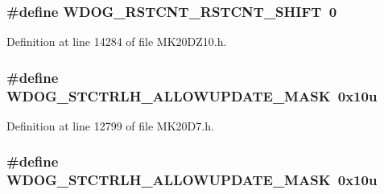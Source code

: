 \subsubsection[{\texorpdfstring{W\+D\+O\+G\+\_\+\+R\+S\+T\+C\+N\+T\+\_\+\+R\+S\+T\+C\+N\+T\+\_\+\+S\+H\+I\+FT}{WDOG_RSTCNT_RSTCNT_SHIFT}}]{\setlength{\rightskip}{0pt plus 5cm}\#define W\+D\+O\+G\+\_\+\+R\+S\+T\+C\+N\+T\+\_\+\+R\+S\+T\+C\+N\+T\+\_\+\+S\+H\+I\+FT~0}\hypertarget{group___w_d_o_g___register___masks_gaf2ecbd74ca7b1ba60bc7b89de17b97a6}{}\label{group___w_d_o_g___register___masks_gaf2ecbd74ca7b1ba60bc7b89de17b97a6}


Definition at line 14284 of file M\+K20\+D\+Z10.\+h.

\subsubsection[{\texorpdfstring{W\+D\+O\+G\+\_\+\+S\+T\+C\+T\+R\+L\+H\+\_\+\+A\+L\+L\+O\+W\+U\+P\+D\+A\+T\+E\+\_\+\+M\+A\+SK}{WDOG_STCTRLH_ALLOWUPDATE_MASK}}]{\setlength{\rightskip}{0pt plus 5cm}\#define W\+D\+O\+G\+\_\+\+S\+T\+C\+T\+R\+L\+H\+\_\+\+A\+L\+L\+O\+W\+U\+P\+D\+A\+T\+E\+\_\+\+M\+A\+SK~0x10u}\hypertarget{group___w_d_o_g___register___masks_gaf524a1ad1f811741b27f29836d6137ee}{}\label{group___w_d_o_g___register___masks_gaf524a1ad1f811741b27f29836d6137ee}


Definition at line 12799 of file M\+K20\+D7.\+h.

\subsubsection[{\texorpdfstring{W\+D\+O\+G\+\_\+\+S\+T\+C\+T\+R\+L\+H\+\_\+\+A\+L\+L\+O\+W\+U\+P\+D\+A\+T\+E\+\_\+\+M\+A\+SK}{WDOG_STCTRLH_ALLOWUPDATE_MASK}}]{\setlength{\rightskip}{0pt plus 5cm}\#define W\+D\+O\+G\+\_\+\+S\+T\+C\+T\+R\+L\+H\+\_\+\+A\+L\+L\+O\+W\+U\+P\+D\+A\+T\+E\+\_\+\+M\+A\+SK~0x10u}\hypertarget{group___w_d_o_g___register___masks_gaf524a1ad1f811741b27f29836d6137ee}{}\label{group___w_d_o_g___register___masks_gaf524a1ad1f811741b27f29836d6137ee}


